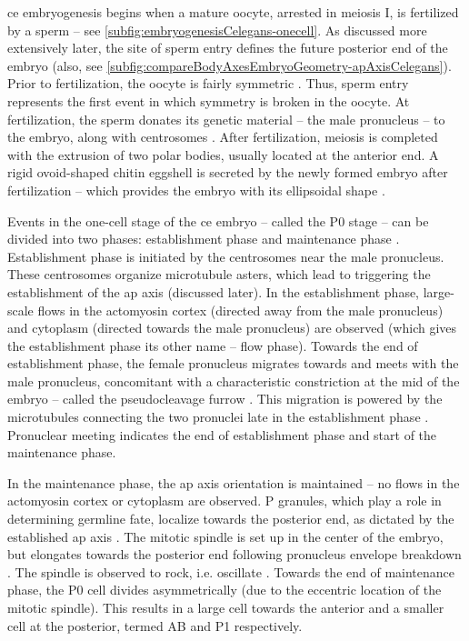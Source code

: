 \ac{ce} embryogenesis begins when a mature oocyte, arrested in meiosis I, is fertilized by a sperm \citep{rose2014polarity,begasse2011} -- see \autoref{subfig:embryogenesisCelegans-onecell}. As discussed more extensively later, the site of sperm entry defines the future posterior end of the embryo \citep{goldstein1996specification} (also, see \autoref{subfig:compareBodyAxesEmbryoGeometry-apAxisCelegans}). Prior to fertilization, the oocyte is fairly symmetric \citep{cuenca2003polarization,cowan2004asymmetric,schonegg2006cdc}. Thus, sperm entry represents the first event in which symmetry is broken in the oocyte. At fertilization, the sperm donates its genetic material -- the male pronucleus -- to the embryo, along with centrosomes \citep{o2000spd,wallenfang2000polarization,cowan2004centrosomes}. After fertilization, meiosis is completed with the extrusion of two polar bodies, usually located at the anterior end. A rigid ovoid-shaped chitin eggshell is secreted by the newly formed embryo after fertilization -- which provides the embryo with its ellipsoidal shape \citep{johnston2012eggshell}.

Events in the one-cell stage of the \ac{ce} embryo -- called the P0 stage -- can be divided into two phases: establishment phase and maintenance phase \citep{cuenca2003polarization}. Establishment phase is initiated by the centrosomes near the male pronucleus. These centrosomes organize microtubule asters, which lead to triggering the establishment of the \ac{ap} axis (discussed later). In the establishment phase, large-scale flows in the actomyosin cortex (directed away from the male pronucleus) and cytoplasm (directed towards the male pronucleus) are observed (which gives the establishment phase its other name -- flow phase). Towards the end of establishment phase, the female pronucleus migrates towards and meets with the male pronucleus, concomitant with a characteristic constriction at the mid of the embryo -- called the pseudocleavage furrow \citep{cuenca2003polarization,nigon1960architecture,reymann2016cortical}. This migration is powered by the microtubules connecting the two pronuclei late in the establishment phase \citep{niwayama2011hydrodynamic}. Pronuclear meeting indicates the end of establishment phase and start of the maintenance phase.

In the maintenance phase, the \ac{ap} axis orientation is maintained -- no flows in the actomyosin cortex or cytoplasm are observed. P granules, which play a role in determining germline fate, localize towards the posterior end, as dictated by the established \ac{ap} axis \citep{gonczy2008mechanisms,hoege2013principles}. The mitotic spindle is set up in the center of the embryo, but elongates towards the posterior end following pronucleus envelope breakdown \citep{grill2003distribution}. The spindle is observed to rock, i.e. oscillate \citep{grill2005theory}. Towards the end of maintenance phase, the P0 cell divides asymmetrically (due to the eccentric location of the mitotic spindle). This results in a large cell towards the anterior and a smaller cell at the posterior, termed AB and P1 respectively. 

